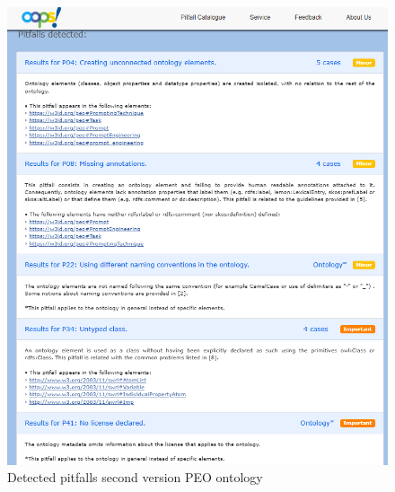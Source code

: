 \begin{figure}[H]
    \centering
    \includegraphics[width=0.75\linewidth]{Figures/fig_44.png}
    \caption{Detected pitfalls second version PEO ontology}
    \label{fig:enter-label}
\end{figure}


